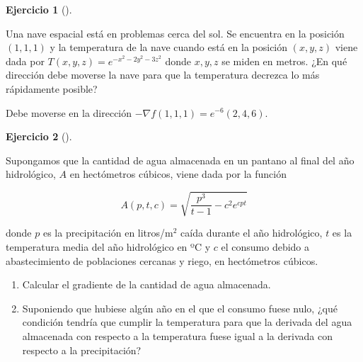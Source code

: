 \documentclass[
  a4paper,
]{scrreport}
\theoremstyle{definition}
\newtheorem{exercise}{Ejercicio}[chapter]
\theoremstyle{remark}
\begin{document}
\begin{exercise}[]\protect\hypertarget{exr-nave-espacial}{}\label{exr-nave-espacial}

Una nave espacial está en problemas cerca del sol. Se encuentra en la
posición \((1,1,1)\) y la temperatura de la nave cuando está en la
posición \((x,y,z)\) viene dada por \(T(x,y,z)=e^{-x^2-2y^2-3z^2}\)
donde \(x,y,z\) se miden en metros. ¿En qué dirección debe moverse la
nave para que la temperatura decrezca lo más rápidamente posible?

\end{exercise}

\begin{tcolorbox}[enhanced jigsaw, bottomrule=.15mm, breakable, colframe=quarto-callout-tip-color-frame, toprule=.15mm, opacityback=0, left=2mm, opacitybacktitle=0.6, colback=white, toptitle=1mm, titlerule=0mm, bottomtitle=1mm, arc=.35mm, title=\textcolor{quarto-callout-tip-color}{\faLightbulb}\hspace{0.5em}{Solución}, rightrule=.15mm, colbacktitle=quarto-callout-tip-color!10!white, leftrule=.75mm, coltitle=black]

Debe moverse en la dirección \(-\nabla f(1,1,1)=e^{-6}(2,4,6)\).

\end{tcolorbox}

\begin{exercise}[]\protect\hypertarget{exr-pantano}{}\label{exr-pantano}

Supongamos que la cantidad de agua almacenada en un pantano al final del
año hidrológico, \(A\) en hectómetros cúbicos, viene dada por la función

\[
A(p,t,c) = \sqrt {\frac{{p^3 }}{{t - 1}} - c^2 e^{cpt}}
\]

donde \(p\) es la precipitación en litros/m\(^2\) caí­da durante el año
hidrológico, \(t\) es la temperatura media del año hidrológico en ºC y
\(c\) el consumo debido a abastecimiento de poblaciones cercanas y
riego, en hectómetros cúbicos.

\begin{enumerate}
\def\labelenumi{\alph{enumi}.}
\item
  Calcular el gradiente de la cantidad de agua almacenada.
\item
  Suponiendo que hubiese algún año en el que el consumo fuese nulo, ¿qué
  condición tendría­ que cumplir la temperatura para que la derivada del
  agua almacenada con respecto a la temperatura fuese igual a la
  derivada con respecto a la precipitación?
\end{enumerate}

\end{exercise}
\end{document}
